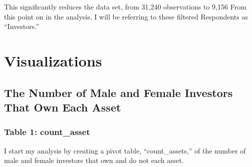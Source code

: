 \documentclass[
]{article}
\newenvironment{Shaded}{\begin{snugshade}}{\end{snugshade}}
\newcommand{\DataTypeTok}[1]{\textcolor[rgb]{0.13,0.29,0.53}{#1}}
\newcommand{\DecValTok}[1]{\textcolor[rgb]{0.00,0.00,0.81}{#1}}
\newcommand{\KeywordTok}[1]{\textcolor[rgb]{0.13,0.29,0.53}{\textbf{#1}}}
\newcommand{\NormalTok}[1]{#1}
\newcommand{\OperatorTok}[1]{\textcolor[rgb]{0.81,0.36,0.00}{\textbf{#1}}}
\newcommand{\StringTok}[1]{\textcolor[rgb]{0.31,0.60,0.02}{#1}}
\begin{document}
\begin{Shaded}
\end{Shaded}

This significantly reduces the data set, from 31,240 observations to
9,156 From this point on in the analysis, I will be referring to these
filtered Respondents as ``Investors.''

\hypertarget{visualizations}{%
\section{Visualizations}\label{visualizations}}

\hypertarget{the-number-of-male-and-female-investors-that-own-each-asset}{%
\subsection{The Number of Male and Female Investors That Own Each
Asset}\label{the-number-of-male-and-female-investors-that-own-each-asset}}

\hypertarget{table-1-count_asset}{%
\subsubsection{Table 1: count\_asset}\label{table-1-count_asset}}

I start my analysis by creating a pivot table, ``count\_assets,'' of the
number of male and female investors that own and do not each asset.

\begin{Shaded}
\end{Shaded}
\end{document}
